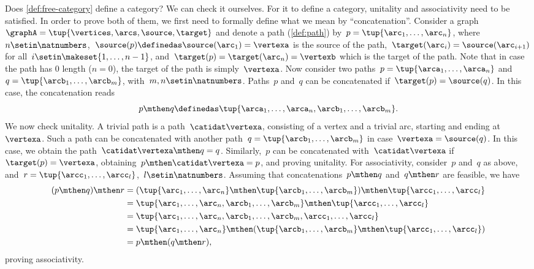Does \cref{def:free-category} define a category?
We can check it ourselves.
For it to define a category, unitality and associativity need to be satisfied.
In order to prove both of them, we first need to formally define what we mean by ``concatenation''.
Consider a graph~$\graphA=\tup{\vertices,\arcs,\source,\target}$ and denote a path (\cref{def:path}) by~$p=\tup{\arc_1,\ldots, \arc_n}$, where~$n\setin \natnumbers$,~$\source(p)\definedas\source(\arc_1)=\vertexa$ is the source of the path,~$\target(\arc_i)=\source(\arc_{i+1})$ for all~$i\setin \makeset{1,\ldots,n-1}$, and~$\target(p)=\target(\arc_n)=\vertexb$ which is the target of the path.
Note that in case the path has 0 length ($n=0$), the target of the path is simply~$\vertexa$.
Now consider two paths~$p=\tup{\arca_1,\ldots,\arca_n}$ and~$q=\tup{\arcb_1,\ldots,\arcb_m}$, with~$m,n\setin \natnumbers$.
Paths~$p$ and~$q$ can be concatenated if~$\target(p)=\source(q)$.
In this case, the concatenation reads
%
\begin{equation}
    p\mthen q\definedas \tup{\arca_1,\ldots, \arca_n,\arcb_1,\ldots,\arcb_m}.
\end{equation}
%
We now check unitality.
A trivial path is a path~$\catidat\vertexa$, consisting of a vertex and a trivial arc, starting and ending at~$\vertexa$.
Such a path can be concatenated with another path~$q=\tup{\arcb_1,\ldots,\arcb_m}$ in case~$\vertexa=\source(q)$.
In this case, we obtain the path~$\catidat\vertexa \mthen q=q$.
Similarly,~$p$ can be concatenated with~$\catidat\vertexa$ if~$\target(p)=\vertexa$, obtaining~$p\mthen \catidat\vertexa=p$, and proving unitality.
For associativity, consider~$p$ and~$q$ as above, and~$r=\tup{\arcc_1,\ldots,\arcc_l}$,~$l\setin \natnumbers$.
Assuming that concatenations~$p\mthen q$ and~$q\mthen r$ are feasible, we have
\begin{equation}
    \begin{aligned}
        (p\mthen q)
        \mthen r & =(\tup{\arc_1,\ldots, \arc_n}\mthen \tup{\arcb_1,\ldots,\arcb_m})\mthen \tup{\arcc_1,\ldots,\arcc_l} \\
                 & =\tup{\arc_1,\ldots, \arc_n,\arcb_1,\ldots,\arcb_m}\mthen \tup{\arcc_1,\ldots,\arcc_l} \\
                 & = \tup{\arc_1,\ldots, \arc_n,\arcb_1,\ldots,\arcb_m, \arcc_1,\ldots,\arcc_l} \\
                 & =\tup{\arc_1,\ldots, \arc_n} \mthen (\tup{\arcb_1,\ldots,\arcb_m}\mthen \tup{\arcc_1,\ldots,\arcc_l}) \\
                 & =p\mthen (q\mthen r),
    \end{aligned}
\end{equation}
proving associativity.

